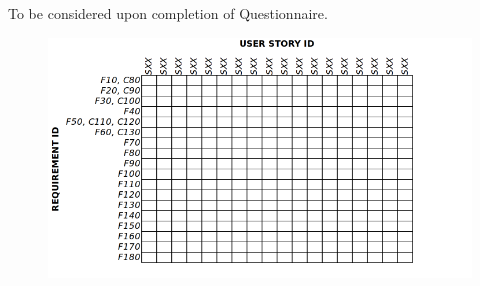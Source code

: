 \documentclass[a4paper,10pt]{article}
\begin{document}
To be considered upon completion of Questionnaire.
\begin{figure}[h]
\includegraphics[width=\textwidth]{coverage_matrix}
\centering
\end{figure}

\newpage

\end{document}
